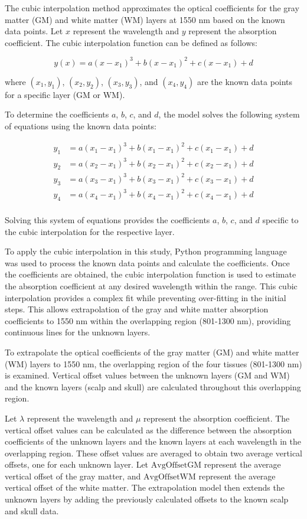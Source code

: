 \documentclass[journal,twoside,web]{ieeecolor}
\begin{document}
The cubic interpolation method approximates the optical coefficients for the gray matter (GM) and white matter (WM) layers at 1550 nm based on the known data points. Let $x$ represent the wavelength and $y$ represent the absorption coefficient. The cubic interpolation function can be defined as follows:

\[
y(x) = a(x-x_1)^3 + b(x-x_1)^2 + c(x-x_1) + d
\]

where $(x_1, y_1)$, $(x_2, y_2)$, $(x_3, y_3)$, and $(x_4, y_4)$ are the known data points for a specific layer (GM or WM).

To determine the coefficients $a$, $b$, $c$, and $d$, the model solves the following system of equations using the known data points:

\[
\begin{aligned}
y_1 &= a(x_1-x_1)^3 + b(x_1-x_1)^2 + c(x_1-x_1) + d \\
y_2 &= a(x_2-x_1)^3 + b(x_2-x_1)^2 + c(x_2-x_1) + d \\
y_3 &= a(x_3-x_1)^3 + b(x_3-x_1)^2 + c(x_3-x_1) + d \\
y_4 &= a(x_4-x_1)^3 + b(x_4-x_1)^2 + c(x_4-x_1) + d \\
\end{aligned}
\]

Solving this system of equations provides the coefficients $a$, $b$, $c$, and $d$ specific to the cubic interpolation for the respective layer.

To apply the cubic interpolation in this study, Python programming language was used to process the known data points and calculate the coefficients. Once the coefficients are obtained, the cubic interpolation function is used to estimate the absorption coefficient at any desired wavelength within the range. This cubic interpolation provides a complex fit while preventing over-fitting in the initial steps. This allows extrapolation of the gray and white matter absorption coefficients to 1550 nm within the overlapping region (801-1300 nm), providing continuous lines for the unknown layers.

To extrapolate the optical coefficients of the gray matter (GM) and white matter (WM) layers to 1550 nm, the overlapping region of the four tissues (801-1300 nm) is examined. Vertical offset values between the unknown layers (GM and WM) and the known layers (scalp and skull) are calculated throughout this overlapping region.

Let \( \lambda \) represent the wavelength and \( \mu \) represent the absorption coefficient. The vertical offset values can be calculated as the difference between the absorption coefficients of the unknown layers and the known layers at each wavelength in the overlapping region. These offset values are averaged to obtain two average vertical offsets, one for each unknown layer. Let \( \text{AvgOffsetGM} \) represent the average vertical offset of the gray matter, and \( \text{AvgOffsetWM} \) represent the average vertical offset of the white matter. The extrapolation model then extends the unknown layers by adding the previously calculated offsets to the known scalp and skull data.
\end{document}
